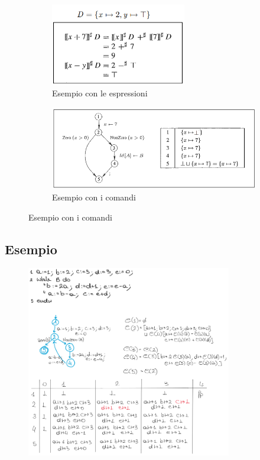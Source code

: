 \documentclass[a4paper,oneside,titlepage]{book}
\begin{document}
\begin{figure}[htp]
	\begin{subfigure}{0.49\textwidth}
	    \centering
		\includegraphics[width=0.65\textwidth]{const6.png}
		\caption{Esempio con le espressioni}
	\end{subfigure}
	\hfill
	\begin{subfigure}{0.49\textwidth}
	    \centering
		\includegraphics[width=\textwidth, height=\textheight, keepaspectratio]{const7.png} 
		\caption{Esempio con i comandi}
	\end{subfigure}
\end{figure}

\subsection{Esempio}
\label{const4}
\begin{figure}[htp]
	\centering
	\includegraphics[width=0.8\textwidth]{const8.png}
\end{figure}
\end{document}
